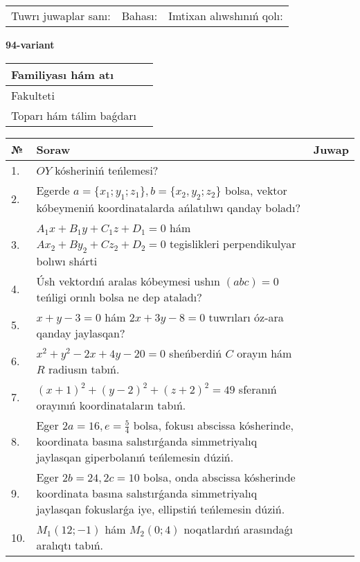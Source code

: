 \documentclass{article}
\begin{document}
\vspace{1cm}

\begin{tabular}{lll}
Tuwrı juwaplar sanı: \underline{\hspace{1.5cm}} & 
Bahası: \underline{\hspace{1.5cm}} & 
Imtixan alıwshınıń qolı: \underline{\hspace{2cm}} \\
\end{tabular}

\egroup

\newpage


\textbf{94-variant}\\

\bgroup
\def\arraystretch{1.6} %

\begin{tabular}{|m{5.7cm}|m{9.5cm}|}
\hline
Familiyası hám atı & \\
\hline
Fakulteti  & \\
\hline
Toparı hám tálim baǵdarı  & \\
\hline
\end{tabular}

\vspace{1cm}

\begin{tabular}{|m{0.7cm}|m{10cm}|m{4cm}|}
\hline
№ & Soraw & Juwap \\
\hline
1. & $OY$ kósheriniń teńlemesi? &  \\
\hline
2. & Egerde $a=\{ x_1; y_1; z_1\}, b=\{ x_2, y_2; z_2\}$ bolsa, vektor kóbeymeniń koordinatalarda ańlatılıwı qanday boladı? &  \\
\hline
3. & $A_1x+B_1y+C_1z+D_1=0$ hám $Ax_2+By_2+Cz_2+D_2=0$ tegislikleri perpendikulyar bolıwı shárti &  \\
\hline
4. & Úsh vektordıń aralas kóbeymesi ushın $(abc)=0$ teńligi orınlı bolsa ne dep ataladı? &  \\
\hline
5. & $x+y-3=0$ hám $2x+3y-8=0$ tuwrıları óz-ara qanday jaylasqan? &  \\
\hline
6. & $x^{2}+y^{2}-2x+4y-20=0$ sheńberdiń $C$ orayın hám $R$ radiusın tabıń. &  \\
\hline
7. & $(x+1)^{2}+(y-2) ^{2}+(z+2) ^{2}=49$ sferanıń orayınıń koordinataların tabıń. &  \\
\hline
8. & Eger $2a=16, e=\frac{5}{4}$ bolsa, fokusı abscissa kósherinde, koordinata basına salıstırǵanda simmetriyalıq jaylasqan giperbolanıń teńlemesin dúziń. &  \\
\hline
9. & Eger $2b=24, 2 c=10$ bolsa, onda abscissa kósherinde koordinata basına salıstırǵanda simmetriyalıq jaylasqan fokuslarǵa iye, ellipstiń teńlemesin dúziń. &  \\
\hline
10. & $M_{1} (12;-1)$ hám $M_{2} (0;4)$ noqatlardıń arasındaǵı aralıqtı tabıń. &  \\
\hline
\end{tabular}
\end{document}
